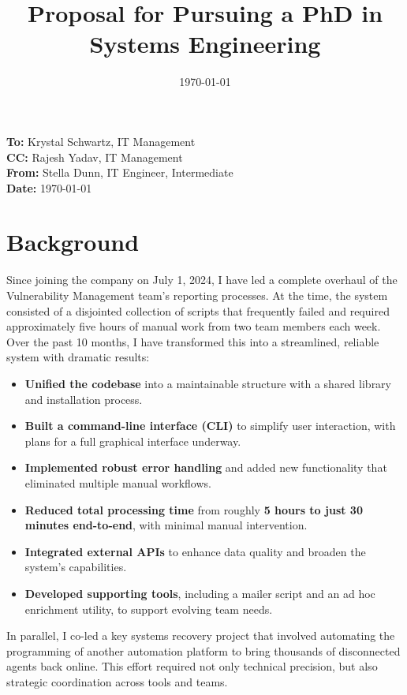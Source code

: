 \documentclass[11pt]{article}
\title{\vspace{-2cm}Proposal for Pursuing a PhD in Systems Engineering}
\author{}
\date{\today}
\begin{document}
\begin{flushright}
\textbf{To:} Krystal Schwartz, IT Management \\
\textbf{CC:} Rajesh Yadav, IT Management \\
\textbf{From:} Stella Dunn, IT Engineer, Intermediate \\
\textbf{Date:} \today
\end{flushright}

\section{Background}

Since joining the company on July 1, 2024, I have led a complete overhaul of the Vulnerability Management team's reporting processes. At the time, the system consisted of a disjointed collection of scripts that frequently failed and required approximately five hours of manual work from two team members each week. Over the past 10 months, I have transformed this into a streamlined, reliable system with dramatic results:

\begin{itemize}
    \item \textbf{Unified the codebase} into a maintainable structure with a shared library and installation process.
    \item \textbf{Built a command-line interface (CLI)} to simplify user interaction, with plans for a full graphical interface underway.
    \item \textbf{Implemented robust error handling} and added new functionality that eliminated multiple manual workflows.
    \item \textbf{Reduced total processing time} from roughly \textbf{5 hours to just 30 minutes end-to-end}, with minimal manual intervention.
    \item \textbf{Integrated external APIs} to enhance data quality and broaden the system's capabilities.
    \item \textbf{Developed supporting tools}, including a mailer script and an ad hoc enrichment utility, to support evolving team needs.
\end{itemize}

In parallel, I co-led a key systems recovery project that involved automating the programming of another automation platform to bring thousands of disconnected agents back online. This effort required not only technical precision, but also strategic coordination across tools and teams.
\end{document}
